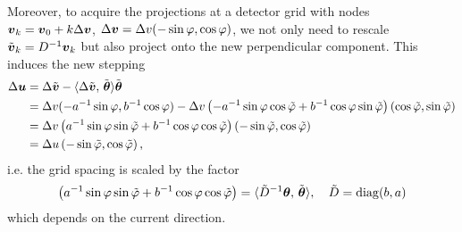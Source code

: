 \documentclass{amsart}
\newcommand*{\Dinv}{{\ensuremath{D^{-1}}}}
\renewcommand*{\phi}{\varphi}
\begin{document}
Moreover, to acquire the projections at a detector grid with nodes 
${\boldsymbol{v}}_k = {\boldsymbol{v}}_0 + k\Delta{\boldsymbol{v}}$, $\Delta \Bv = \Delta v (-\sin\phi, \cos\phi)$, we not only need to rescale $\tilde \Bv_k = \Dinv\Bv_k$ but 
also project onto the new perpendicular component. This induces the new stepping 
%
\begin{align*}
 \Delta\Bu 
 &= \Delta\tilde\Bv - \INNER{\Delta\tilde\Bv}{\tilde\Btheta}\tilde\Btheta \\
 &= \Delta v (-a^{-1}\sin\phi, b^{-1}\cos\phi) - \Delta v \left(-a^{-1}\sin\phi \cos\tilde\phi + b^{-1}\cos\phi \sin\tilde\phi\right) 
 \left(\cos\tilde\phi,  \sin\tilde\phi\right) \\
 &= \Delta v \left(a^{-1} \sin\phi \sin\tilde\phi + b^{-1} \cos\phi \cos\tilde\phi \right) \left(-\sin\tilde\phi, \cos\tilde\phi\right) \\
 &= \Delta u \left(-\sin\tilde\phi, \cos\tilde\phi\right),
\end{align*}
%
i.e. the grid spacing is scaled by the factor
%
\begin{equation*}
 \left(a^{-1} \sin\phi \sin\tilde\phi + b^{-1} \cos\phi \cos\tilde\phi \right) = \INNER{\tilde D^{-1} \Btheta}{\tilde\Btheta}, \quad 
 \tilde D = \DIAG(b, a)
\end{equation*}
%
which depends on the current direction.
\end{document}
